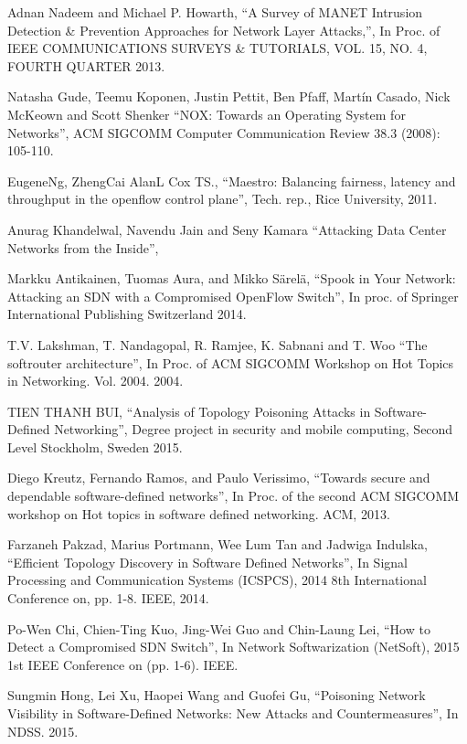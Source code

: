 \begin{thebibliography}{1}

Adnan Nadeem and Michael P. Howarth,
``A Survey of MANET Intrusion Detection \& Prevention Approaches for Network Layer Attacks,'', In Proc. of IEEE COMMUNICATIONS SURVEYS \& TUTORIALS, VOL. 15, NO. 4, FOURTH QUARTER 2013.

Natasha Gude, Teemu Koponen, Justin Pettit, Ben Pfaff, Martín Casado, Nick McKeown and Scott Shenker
``NOX: Towards an Operating System for Networks'', ACM SIGCOMM Computer Communication Review 38.3 (2008): 105-110.

\bibitem{}
EugeneNg, ZhengCai AlanL Cox TS.,
``Maestro: Balancing fairness, latency and throughput in the openflow control plane'', Tech. rep., Rice University, 2011.

Anurag Khandelwal, Navendu Jain and Seny Kamara
``Attacking Data Center Networks from the Inside'', 

Markku Antikainen, Tuomas Aura, and Mikko Särelä,
``Spook in Your Network: Attacking an SDN with a Compromised OpenFlow Switch'', In proc. of Springer International Publishing Switzerland 2014.

T.V. Lakshman, T. Nandagopal, R. Ramjee, K. Sabnani and T. Woo
``The softrouter architecture'', In Proc. of ACM SIGCOMM Workshop on Hot Topics in Networking. Vol. 2004. 2004.

TIEN THANH BUI,
``Analysis of Topology Poisoning Attacks in Software-Defined Networking'', Degree project in security and mobile computing, Second Level Stockholm, Sweden 2015.

Diego Kreutz, Fernando Ramos, and Paulo Verissimo,
``Towards secure and dependable software-defined networks'', In Proc. of the second ACM SIGCOMM workshop on Hot topics in software defined networking. ACM, 2013.

Farzaneh Pakzad, Marius Portmann, Wee Lum Tan and Jadwiga Indulska,
``Efficient Topology Discovery in Software Defined Networks'', In Signal Processing and Communication Systems (ICSPCS), 2014 8th International Conference on, pp. 1-8. IEEE, 2014. 

Po-Wen Chi, Chien-Ting Kuo, Jing-Wei Guo and Chin-Laung Lei,
``How to Detect a Compromised SDN Switch'', In Network Softwarization (NetSoft), 2015 1st IEEE Conference on (pp. 1-6). IEEE.

Sungmin Hong, Lei Xu, Haopei Wang and Guofei Gu,
``Poisoning Network Visibility in Software-Defined Networks: New Attacks and Countermeasures'', In NDSS. 2015. 


\end{thebibliography}
